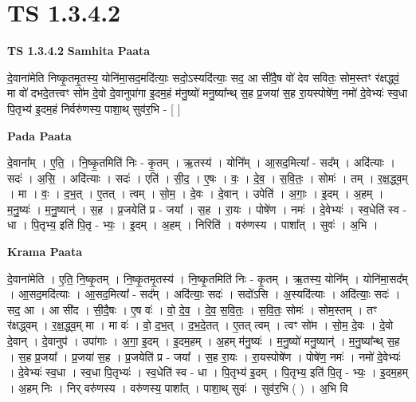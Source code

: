 \documentclass[17pt]{extarticle}
\begin{document}
\section{ TS 1.3.4.2 }

\textbf{TS 1.3.4.2 } \newline
\textbf{Samhita Paata} \newline

दे॒वाना॑मेति निष्कृ॒तमृ॒तस्य॒ योनि॑मा॒सद॒मदि॑त्याः॒ सदो॒ऽस्यदि॑त्याः॒ सद॒ आ सी॑दै॒ष वो॑ देव सवितः॒ सोम॒स्तꣳ र॑क्षद्ध्वं॒ मा वो॑ दभदे॒तत्त्वꣳ सो॑म दे॒वो दे॒वानुपा॑गा इ॒दम॒हं म॑नु॒ष्यो॑ मनु॒ष्या᳚न्थ् स॒ह प्र॒जया॑ स॒ह रा॒यस्पोषे॑ण॒ नमो॑ दे॒वेभ्यः॑ स्व॒धा पि॒तृभ्य॑ इ॒दम॒हं निर्वरु॑णस्य॒ पाशा॒थ् सुव॑र॒भि - [ ] \newline

\textbf{Pada Paata} \newline

दे॒वाना᳚म् । ए॒ति॒ । नि॒ष्कृ॒तमिति॑ निः - कृ॒तम् । ऋ॒तस्य॑ । योनि᳚म् । आ॒सद॒मित्या᳚ - सद᳚म् । अदि॑त्याः । सदः॑ । अ॒सि॒ । अदि॑त्याः । सदः॑ । एति॑ । सी॒द॒ । ए॒षः । वः॒ । दे॒व॒ । स॒वि॒तः॒ । सोमः॑ । तम् । र॒क्ष॒द्ध्व॒म् । मा । वः॒ । द॒भ॒॒त् । ए॒तत् । त्वम् । सो॒म॒ । दे॒वः । दे॒वान् । उपेति॑ । अ॒गाः॒ । इ॒दम् । अ॒हम् । म॒नु॒ष्यः॑ । म॒नु॒ष्यान्॑ । स॒ह । प्र॒जयेति॑ प्र - जया᳚ । स॒ह । रा॒यः । पोषे॑ण । नमः॑ । दे॒वेभ्यः॑ । स्व॒धेति॑ स्व - धा । पि॒तृभ्य॒ इति॑ पि॒तृ - भ्यः॒ । इ॒दम् । अ॒हम् । निरिति॑ । वरु॑णस्य । पाशा᳚त् । सुवः॑ । अ॒भि ।  \newline


\textbf{Krama Paata} \newline

दे॒वाना॑मेति । ए॒ति॒ नि॒ष्कृ॒तम् । नि॒ष्कृ॒तमृ॒तस्य॑ । नि॒ष्कृ॒तमिति॑ निः - कृ॒तम् । ऋ॒तस्य॒ योनि᳚म् । योनि॑मा॒सद᳚म् । आ॒सद॒मदि॑त्याः । आ॒सद॒मित्या᳚ - सद᳚म् । अदि॑त्याः॒ सदः॑ । सदो॑ऽसि । अ॒स्यदि॑त्याः । अदि॑त्याः॒ सदः॑ । सद॒ आ । आ सी॑द । सी॒दै॒षः । ए॒ष वः॑ । वो॒ दे॒व॒ । दे॒व॒ स॒वि॒तः॒ । स॒वि॒तः॒ सोमः॑ । सोम॒स्तम् । तꣳ र॑क्षद्ध्वम् । र॒क्ष॒द्ध्व॒म् मा । मा वः॑ । वो॒ द॒भ॒त् । द॒भ॒दे॒तत् । ए॒तत् त्वम् । त्वꣳ सो॑म । सो॒म॒ दे॒वः । दे॒वो दे॒वान् । दे॒वानुप॑ । उपा॑गाः । अ॒गा॒ इ॒दम् । इ॒दम॒हम् । अ॒हम् म॑नु॒ष्यः॑ । म॒नु॒ष्यो॑ मनु॒ष्यान्॑ । म॒नु॒ष्या᳚न्थ् स॒ह । स॒ह प्र॒जया᳚ । प्र॒जया॑ स॒ह । प्र॒जयेति॑ प्र - जया᳚ । स॒ह रा॒यः । रा॒यस्पोषे॑ण । पोषे॑ण॒ नमः॑ । नमो॑ दे॒वेभ्यः॑ । दे॒वेभ्यः॑ स्व॒धा । स्व॒धा पि॒तृभ्यः॑ । स्व॒धेति॑ स्व - धा । पि॒तृभ्य॑ इ॒दम् । पि॒तृभ्य॒ इति॑ पि॒तृ - भ्यः॒ । इ॒दम॒हम् । अ॒हम् निः । निर् वरु॑णस्य । वरु॑णस्य॒ पाशा᳚त् । पाशा॒थ् सुवः॑ । सुव॑र॒भि ( ) । अ॒भि वि \newline
\end{document}
